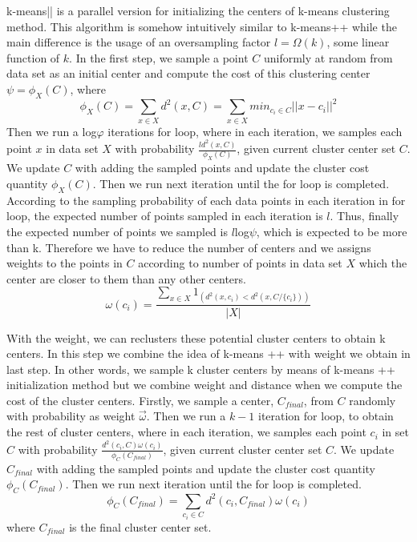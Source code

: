 \documentclass{article}
\begin{document}
k-means|| is a parallel version for initializing the centers of k-means clustering method. This algorithm is somehow intuitively similar to k-means++ while the main difference is the usage of an oversampling factor $l = \Omega(k)$, some linear function of $k$.
In the first step, we sample a point $C$ uniformly at random from data set as an initial center and compute the cost of this clustering center $\psi = \phi_X(C)$, where
\begin{equation}
\phi_X(C) = \sum_{x\in X} d^2(x,C) = \sum_{x\in X} min_{c_i \in C} ||x-c_i||^2
\end{equation}
Then we run a log$\varphi$ iterations for loop, where in each iteration, we samples each point $x$ in data set $X$ with probability $\frac{ld^2(x, C)}{\phi_X(C)}$, given current cluster center set $C$. 
We update $C$ with adding the sampled points and update the cluster cost quantity $\phi_X(C)$. Then we run next iteration until the for loop is completed. 
According to the sampling probability of each data points in each iteration in for loop, the expected number of points sampled in each iteration is $l$. Thus, finally the expected number of points we sampled is $l$log$\psi$, which is expected to be more than k. 
Therefore we have to reduce the number of centers and we assigns weights to the points in $C$ according to number of points in data set $X$ which the center are closer to them than any other centers.
\begin{equation}
\omega(c_i) =  \frac{\sum_{x\in X} 1_{(d^2(x,c_i) < d^2(x,C/\{c_i\}))}}{|X|}
\end{equation}

With the weight, we can reclusters these potential cluster centers to obtain k centers. In this step we combine the idea of k-means ++ with weight we obtain in last step. In other words, we sample k cluster centers by means of k-means ++ initialization method but we combine weight and distance when we compute the cost of the cluster centers. Firstly, we sample a center, $C_{final}$, from $C$ randomly with probability as weight $\vec{\omega}$. 
Then we run a $k-1$ iteration for loop, to obtain the rest of cluster centers, where in each iteration, we samples each point $c_i$ in set $C$ with probability $\frac{d^2(c_i, C)\omega(c_i)}{\phi_C(C_{final})}$, given current cluster center set $C$. 
We update $C_{final}$ with adding the sampled points and update the cluster cost quantity $\phi_C(C_{final})$. Then we run next iteration until the for loop is completed. 
\begin{equation}
\phi_C(C_{final}) = \sum_{c_i\in C} d^2(c_i,C_{final}) \omega(c_i)
\end{equation}
where $C_{final}$ is the final cluster center set.
\end{document}
